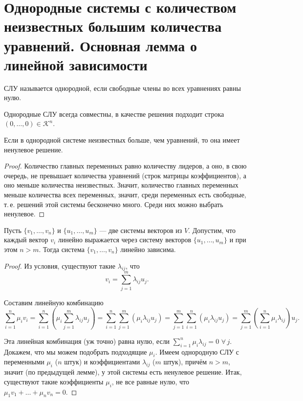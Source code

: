 \section{Однородные системы с количеством неизвестных большим количества уравнений. Основная лемма о линейной зависимости}

\begin{definition}
    СЛУ называется однородной, если свободные члены во всех уравнениях равны нулю.
\end{definition}

\begin{remark}
    Однородные СЛУ всегда совместны, в качестве решения подходит строка $(0, \ldots, 0) \in \mathcal{K}^n$.
\end{remark}

\begin{lemma}
    Если в однородной системе неизвестных больше, чем уравнений, то она имеет ненулевое решение.
\end{lemma}

\begin{proof}
    Количество главных переменных равно количеству лидеров, а оно, в свою очередь, не превышает количества уравнений (строк матрицы коэффициентов), а оно меньше количества неизвестных. Значит, количество главных переменных меньше количества всех переменных, значит, среди переменных есть свободные, т.\,е. решений этой системы бесконечно много. Среди них можно выбрать ненулевое.
\end{proof}

\begin{lemma}
    Пусть $\{v_1, \ldots, v_n\}$ и $\{u_1, \ldots, u_m\}$ --- две системы векторов из $V$. Допустим, что каждый вектор $v_i$ линейно выражается через систему векторов $\{u_1, \ldots, u_m\}$ и при этом $n > m$. Тогда система $\{v_1, \ldots, v_n\}$ линейно зависима.
\end{lemma}

\begin{proof}
    Из условия, существуют такие $\lambda_{ij}$, что
    $$
    v_i = \sum_{j = 1}^m\lambda_{ij}u_j.
    $$


    Составим линейную комбинацию
    $$
    \sum_{i = 1}^n\mu_iv_i = \sum_{i = 1}^n\left(\mu_i\sum_{j = 1}^m\lambda_{ij}u_j\right) = \sum_{i = 1}^n\sum_{j = 1}^m(\mu_i\lambda_{ij}u_j) = \sum_{j = 1}^m\sum_{i = 1}^n(\mu_i\lambda_{ij}u_j) = \sum_{j = 1}^m\left(\sum_{i = 1}^n\mu_i\lambda_{ij}\right)u_j.
    $$

    Эта линейная комбинация (уж точно) равна нулю, если $\displaystyle \sum_{i = 1}^n\mu_i\lambda_{ij} = 0$ $\forall\!\,j$. Докажем, что мы можем подобрать подходящие $\mu_i$. Имеем однородную СЛУ с переменными $\mu_i$ ($n$ штук) и коэффициентами $\lambda_{ij}$ ($m$ штук), причём $n > m$, значит (по предыдущей лемме), у этой системы есть ненулевое решение. Итак, существуют такие коэффициенты $\mu_i$, не все равные нулю, что $\mu_1v_1 + \ldots + \mu_nv_n = 0$. 
\end{proof}

